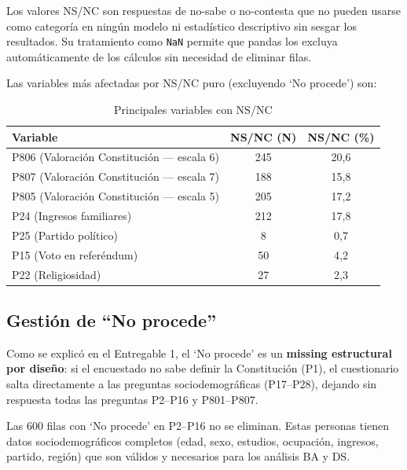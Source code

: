 \documentclass[12pt,a4paper]{article}
\newcommand{\thead}[1]{\cellcolor{tableheader}\color{white}\textbf{#1}}
\begin{document}
Los valores NS/NC son respuestas de no-sabe o no-contesta que no pueden usarse como categoría en ningún modelo ni estadístico descriptivo sin sesgar los resultados. Su tratamiento como \texttt{NaN} permite que pandas los excluya automáticamente de los cálculos sin necesidad de eliminar filas.

Las variables más afectadas por NS/NC puro (excluyendo `No procede') son:

\begin{table}[H]
\centering
\renewcommand{\arraystretch}{1.3}
\begin{tabular}{lcc}
\toprule
\thead{Variable} & \thead{NS/NC (N)} & \thead{NS/NC (\%)} \\
\midrule
P806 (Valoración Constitución — escala 6) & 245 & 20,6 \\
\rowcolor{tablerow}
P807 (Valoración Constitución — escala 7) & 188 & 15,8 \\
P805 (Valoración Constitución — escala 5) & 205 & 17,2 \\
\rowcolor{tablerow}
P24  (Ingresos familiares)                & 212 & 17,8 \\
P25  (Partido político)                   &   8 &  0,7 \\
\rowcolor{tablerow}
P15  (Voto en referéndum)                 &  50 &  4,2 \\
P22  (Religiosidad)                       &  27 &  2,3 \\
\bottomrule
\end{tabular}
\caption{Principales variables con NS/NC}
\end{table}

\subsection{Gestión de ``No procede''}

Como se explicó en el Entregable 1, el `No procede' es un \textbf{missing estructural por diseño}: si el encuestado no sabe definir la Constitución (P1), el cuestionario salta directamente a las preguntas sociodemográficas (P17--P28), dejando sin respuesta todas las preguntas P2--P16 y P801--P807.

\begin{notebox}
Las 600 filas con `No procede' en P2--P16 no se eliminan. Estas personas tienen datos sociodemográficos completos (edad, sexo, estudios, ocupación, ingresos, partido, región) que son válidos y necesarios para los análisis BA y DS.
\end{notebox}
\end{document}
